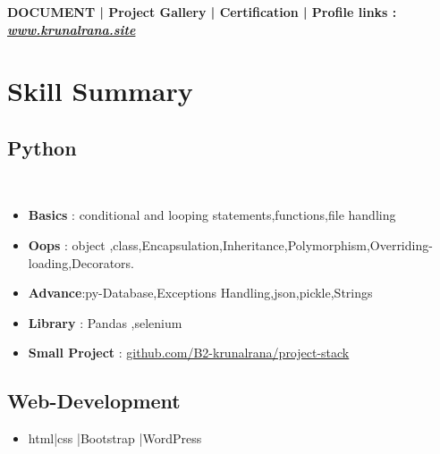 \documentclass[]{deedy-resume-openfont}
\begin{document}
\begin{minipage}[t]{0.66\textwidth}


\textbf{DOCUMENT | Project Gallery | Certification | Profile links  : \\
 \textit{{  \href{https://www.krunalrana.site/}{www.krunalrana.site} } }}\\ 
\sectionsep

 
% 
% 
\sectionsep

\end{minipage} 
\sectionsep
\section{Skill Summary}

\subsection{Python}
\\
\begin{itemize}
\item \textbf{Basics} : conditional and looping statements,functions,file handling
\end{itemize}
\begin{itemize}
\item \textbf{Oops} : object ,class,Encapsulation,Inheritance,Polymorphism,Overriding-loading,Decorators.
\end{itemize}
\begin{itemize}
\item \textbf{Advance}:py-Database,Exceptions Handling,json,pickle,Strings
\end{itemize}
\begin{itemize}
\item \textbf{Library} : Pandas ,selenium
\end{itemize}
\begin{itemize}
\item \textbf{Small Project} :  \href{https://github.com/B2-krunalrana/project-stack}{github.com/B2-krunalrana/project-stack }
\end{itemize}

\subsection{Web-Development}
\begin{itemize}
\item html|css |Bootstrap |WordPress
\end{itemize}
\end{document}
